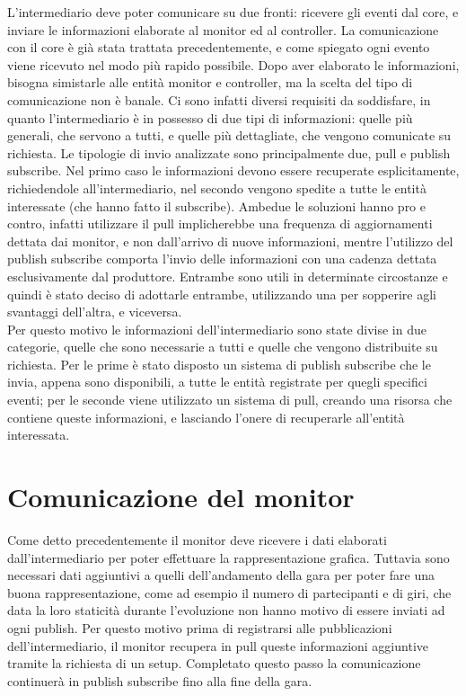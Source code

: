 L’intermediario deve poter comunicare su due fronti: ricevere gli eventi dal core, e inviare le informazioni elaborate al monitor ed al controller.
La comunicazione con il core è già stata trattata precedentemente, e come spiegato ogni evento viene ricevuto nel modo più rapido possibile.
Dopo aver elaborato le informazioni, bisogna simistarle alle entità monitor e controller, ma la scelta del tipo di comunicazione non è banale.
Ci sono infatti diversi requisiti da soddisfare, in quanto l’intermediario è in possesso di due tipi di informazioni: quelle più generali, che servono a tutti, e quelle più dettagliate, che vengono comunicate su richiesta.
Le tipologie di invio analizzate sono principalmente due, pull e publish subscribe. Nel primo caso le informazioni devono essere recuperate esplicitamente, richiedendole all’intermediario, nel secondo vengono spedite a tutte le entità interessate (che hanno fatto il subscribe).
Ambedue le soluzioni hanno pro e contro, infatti utilizzare il pull implicherebbe una frequenza di aggiornamenti dettata dai monitor, e non dall’arrivo di nuove informazioni, mentre l’utilizzo del publish subscribe comporta l'invio delle informazioni con una cadenza dettata esclusivamente dal produttore.
Entrambe sono utili in determinate circostanze e quindi è stato deciso di adottarle entrambe, utilizzando una per sopperire agli svantaggi dell’altra, e viceversa.\\
Per questo motivo le informazioni dell’intermediario sono state divise in due categorie, quelle che sono necessarie a tutti e quelle che vengono distribuite su richiesta. Per le prime è stato disposto un sistema di publish subscribe che le invia, appena sono disponibili, a tutte le entità registrate per quegli specifici eventi; per le seconde viene utilizzato un sistema di pull, creando una risorsa che contiene queste informazioni, e lasciando l’onere di recuperarle all’entità interessata.


\section{Comunicazione del monitor}

Come detto precedentemente il monitor deve ricevere i dati elaborati dall’intermediario per poter effettuare la rappresentazione grafica.
Tuttavia sono necessari dati aggiuntivi a quelli dell’andamento della gara per poter fare una buona rappresentazione, come ad esempio il numero di partecipanti e di giri, che data la loro staticità durante l’evoluzione non hanno motivo di essere inviati ad ogni publish. Per questo motivo prima di registrarsi alle pubblicazioni dell’intermediario, il monitor recupera in pull queste informazioni aggiuntive tramite la richiesta di un setup.
Completato questo passo la comunicazione continuerà in publish subscribe fino alla fine della gara.

